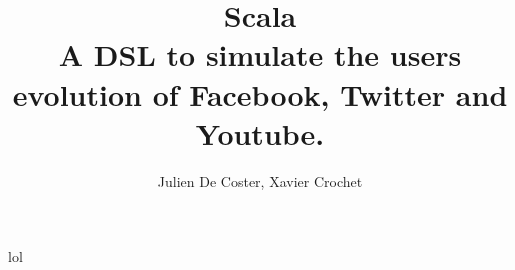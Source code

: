 \documentclass[10pt,a4paper]{report}
\author{Julien De Coster, Xavier Crochet}
\title{Scala \\ A DSL to simulate the users evolution of Facebook, Twitter and Youtube.}
\begin{document}
\maketitle

lol
\end{document}
